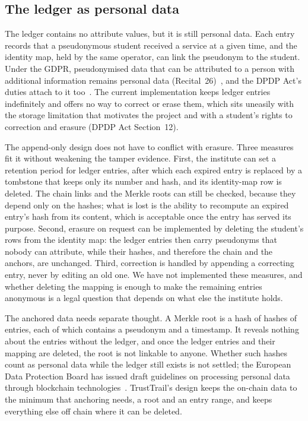 \subsection{The ledger as personal data}
\label{sec:discussion-ledger}
The ledger contains no attribute values, but it is still personal data. Each entry records that a pseudonymous student received a service at a given time, and the identity map, held by the same operator, can link the pseudonym to the student. Under the GDPR, pseudonymised data that can be attributed to a person with additional information remains personal data (Recital~26)~\cite{gdpr2016}, and the DPDP Act's duties attach to it too~\cite{dpdp2023}. The current implementation keeps ledger entries indefinitely and offers no way to correct or erase them, which sits uneasily with the storage limitation that motivates the project and with a student's rights to correction and erasure (DPDP Act Section~12).

The append-only design does not have to conflict with erasure. Three measures fit it without weakening the tamper evidence. First, the institute can set a retention period for ledger entries, after which each expired entry is replaced by a tombstone that keeps only its number and hash, and its identity-map row is deleted. The chain links and the Merkle roots can still be checked, because they depend only on the hashes; what is lost is the ability to recompute an expired entry's hash from its content, which is acceptable once the entry has served its purpose. Second, erasure on request can be implemented by deleting the student's rows from the identity map: the ledger entries then carry pseudonyms that nobody can attribute, while their hashes, and therefore the chain and the anchors, are unchanged. Third, correction is handled by appending a correcting entry, never by editing an old one. We have not implemented these measures, and whether deleting the mapping is enough to make the remaining entries anonymous is a legal question that depends on what else the institute holds.

The anchored data needs separate thought. A Merkle root is a hash of hashes of entries, each of which contains a pseudonym and a timestamp. It reveals nothing about the entries without the ledger, and once the ledger entries and their mapping are deleted, the root is not linkable to anyone. Whether such hashes count as personal data while the ledger still exists is not settled; the European Data Protection Board has issued draft guidelines on processing personal data through blockchain technologies~\cite{edpb2025blockchain}. TrustTrail's design keeps the on-chain data to the minimum that anchoring needs, a root and an entry range, and keeps everything else off chain where it can be deleted.

